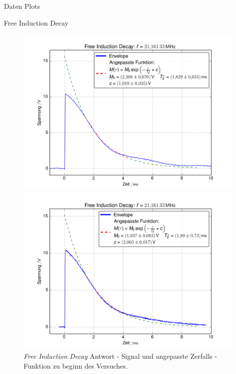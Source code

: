 \begin{appendix}
\begin{chapter}{Daten Plots}
    \newpage
    \begin{section}{Free Induction Decay}
      \label{chpAnhangFID}
      \begin{figure}[htb!]
        \centering
        \begin{minipage}{.48\textwidth}
          \centering
          \includegraphics[width=\textwidth]{Figures/FID_env1.png}
          \caption{\textit{Free Induction Decay} Antwort - Signal und angepasste
            Zerfalls - Funktion zu beginn des Versuches.}
          \label{AnhangfigFIDenv1}
        \end{minipage}\quad
        \begin{minipage}{.48\textwidth}
          \centering
          \includegraphics[width=\textwidth]{Figures/FID_env2.png}

\end{minipage}
\end{figure}
\end{section}
\end{chapter}
\end{appendix}
